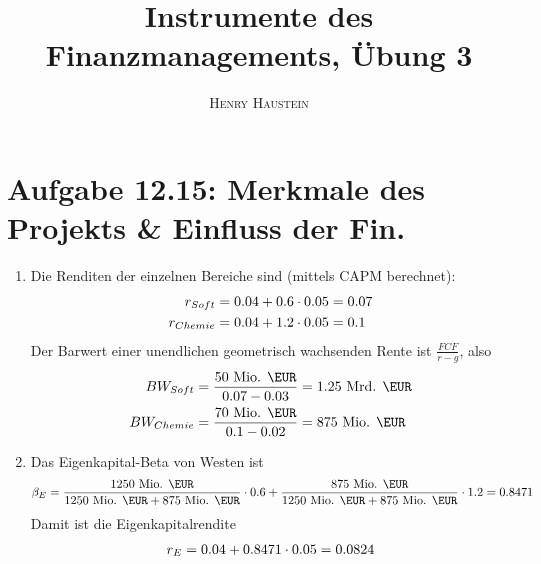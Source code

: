 \documentclass{article}
\title{\textbf{Instrumente des Finanzmanagements, Übung 3}}
\author{\textsc{Henry Haustein}}
\date{}
\begin{document}
	\maketitle

	\section*{Aufgabe 12.15: Merkmale des Projekts \& Einfluss der Fin.}
	\begin{enumerate}[label=(\alph*)]
		\item Die Renditen der einzelnen Bereiche sind (mittels CAPM berechnet):
		\begin{align}
			r_{Soft} &= 0.04 + 0.6\cdot 0.05 = 0.07 \notag \\
			r_{Chemie} &= 0.04 + 1.2\cdot 0.05 = 0.1 \notag
		\end{align}
		Der Barwert einer unendlichen geometrisch wachsenden Rente ist $\frac{FCF}{r-g}$, also
		\begin{align}
			BW_{Soft} &= \frac{50\text{ Mio. \EUR}}{0.07-0.03} = 1.25\text{ Mrd. \EUR} \notag \\
			BW_{Chemie} &= \frac{70\text{ Mio. \EUR}}{0.1-0.02} = 875\text{ Mio. \EUR} \notag
		\end{align}
		\item Das Eigenkapital-Beta von Westen ist
		\begin{align}
			\beta_E = \frac{1250\text{ Mio. \EUR}}{1250\text{ Mio. \EUR} + 875\text{ Mio. \EUR}} \cdot 0.6 + \frac{875\text{ Mio. \EUR}}{1250\text{ Mio. \EUR} + 875\text{ Mio. \EUR}}\cdot 1.2 = 0.8471 \notag
		\end{align}
		Damit ist die Eigenkapitalrendite
		\begin{align}
			r_E = 0.04 + 0.8471\cdot 0.05 = 0.0824 \notag
		\end{align}
	\end{enumerate}
	
\end{document}
